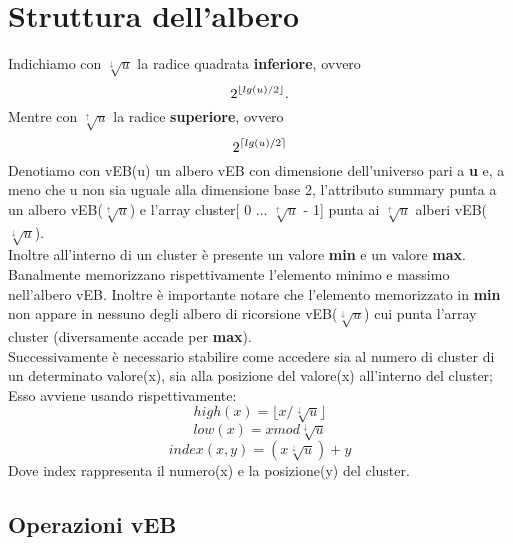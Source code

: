 \documentclass{article}
\begin{document}
\section{Struttura dell'albero}
    Indichiamo con $\sqrt[\downarrow]{u}$ la radice quadrata \textbf{inferiore}, ovvero 
    \begin{equation}
        \centering2^{\lfloor lg(u) / 2 \rfloor}.
    \end{equation}
    Mentre con $\sqrt[\uparrow]{u}$ la radice \textbf{superiore}, ovvero 
    \begin{equation}
        \centering2^{\lceil lg(u) / 2 \rceil}
    \end{equation}
    Denotiamo con vEB(u) un albero vEB con dimensione dell'universo pari a \textbf{u} e, a meno che u non sia uguale alla dimensione base 2, l'attributo summary punta a un albero vEB($\sqrt[\uparrow]{u}$) e l'array cluster[ 0 $\dots$ $\sqrt[\uparrow]{u}$ - 1] punta ai $\sqrt[\uparrow]{u}$ alberi vEB($\sqrt[\downarrow]{u}$).\\
    Inoltre all'interno di un cluster è presente un valore \textbf{min} e un valore \textbf{max}. Banalmente memorizzano rispettivamente l'elemento minimo e massimo nell'albero vEB. Inoltre è importante notare che l'elemento memorizzato in \textbf{min} non appare in nessuno degli albero di ricorsione vEB($\sqrt[\downarrow]{u}$) cui punta l'array cluster (diversamente accade per \textbf{max}).\\
    Successivamente è necessario stabilire come accedere sia al numero di cluster di un determinato valore(x), sia alla posizione del valore(x) all'interno del cluster; Esso avviene usando rispettivamente:\\
    \begin{equation}
        high(x) = \lfloor x / \sqrt[\downarrow]{u} \rfloor
    \end{equation}
    \begin{equation}
        low(x) = x mod \sqrt[\downarrow]{u}
    \end{equation}
    \begin{equation}
        index(x, y) = (x\sqrt[\downarrow]{u}) + y
    \end{equation}
    Dove index rappresenta il numero(x) e la posizione(y) del cluster. 
    \\

    \subsection{Operazioni vEB}
\end{document}
